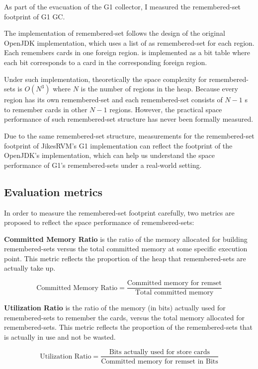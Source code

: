 As part of the evacuation of the G1 collector, I measured the remembered-set footprint
of G1 GC.

The implementation of remembered-set follows the design of the original OpenJDK
implementation, which uses a list of  as remembered-set
for each region. Each  remembers cards in one foreign region.
 is implemented as a bit table where each bit corresponds
to a card in the corresponding foreign region. 

Under such implementation, theoretically the space complexity for remembered-sets
is $O(N^3)$ where $N$ is the number of regions in the heap. Because every region
has its own remembered-set and each remembered-set consists of $N-1$ s
to remember cards in other $N-1$ regions. However, the practical space performance
of such remembered-set structure has never been formally measured.

Due to the same remembered-set structure,
measurements for the remembered-set footprint of JikesRVM's G1 implementation can reflect
the footprint of the OpenJDK's implementation, which can help us understand the
space performance of G1's remembered-sets under a real-world setting.

\subsection{Evaluation metrics}

In order to measure the remembered-set footprint carefully, two metrics are proposed
to reflect the space performance of remembered-sets:

\textbf{Committed Memory Ratio} is the ratio of the memory allocated for building remembered-sets
versus the total committed memory at some specific execution point.
This metric reflects the proportion of the heap that remembered-sets are actually take up.

$$ \text{Committed Memory Ratio} = \frac{\text{Committed memory for remset}}{\text{Total committed memory}} $$

\textbf{Utilization Ratio} is the ratio of the memory (in bits) actually used for
remembered-sets to remember the cards, versus the total memory allocated for remembered-sets.
This metric reflects the proportion of the remembered-sets that is actually in use
and not be wasted.

$$ \text{Utilization Ratio} = \frac{\text{Bits actually used for store cards}}{\text{Committed memory for remset in Bits}} $$

